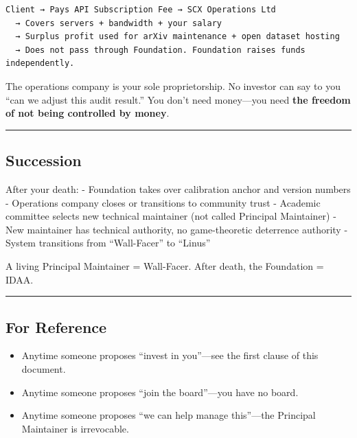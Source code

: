 \documentclass[
  12pt,
]{article}
\providecommand{\tightlist}{%
  \setlength{\itemsep}{0pt}\setlength{\parskip}{0pt}}
\begin{document}
\begin{verbatim}
Client → Pays API Subscription Fee → SCX Operations Ltd
  → Covers servers + bandwidth + your salary
  → Surplus profit used for arXiv maintenance + open dataset hosting
  → Does not pass through Foundation. Foundation raises funds independently.
\end{verbatim}

The operations company is your sole proprietorship. No investor can say to you ``can we adjust this audit result.'' You don't need money---you need \textbf{the freedom of not being controlled by money}.

\begin{center}\rule{0.5\linewidth}{0.5pt}\end{center}

\subsection{Succession}\label{succession}

After your death: - Foundation takes over calibration anchor and version numbers - Operations company closes or transitions to community trust - Academic committee selects new technical maintainer (not called Principal Maintainer) - New maintainer has technical authority, no game-theoretic deterrence authority - System transitions from ``Wall-Facer'' to ``Linus''

A living Principal Maintainer = Wall-Facer. After death, the Foundation = IDAA.

\begin{center}\rule{0.5\linewidth}{0.5pt}\end{center}

\subsection{For Reference}\label{for-reference}

\begin{itemize}
\tightlist
\item
  Anytime someone proposes ``invest in you''---see the first clause of this document.
\item
  Anytime someone proposes ``join the board''---you have no board.
\item
  Anytime someone proposes ``we can help manage this''---the Principal Maintainer is irrevocable.
\end{itemize}
\end{document}
